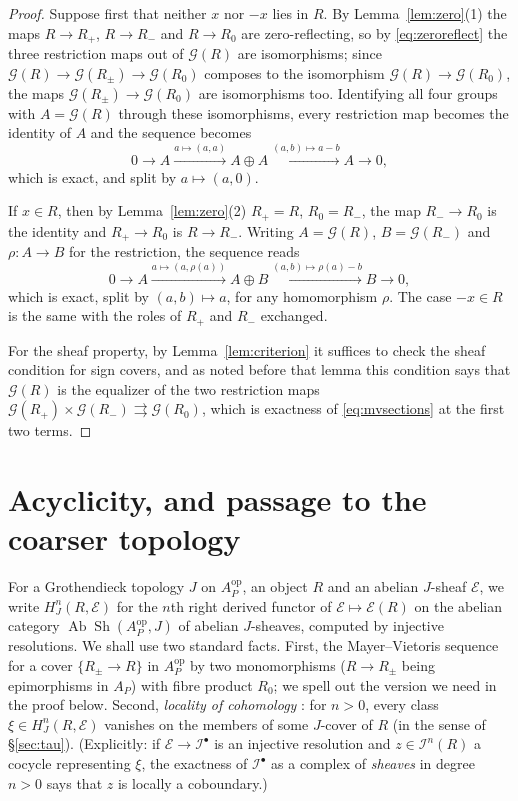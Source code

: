 \documentclass[12pt]{article}
\newcommand{\Sh}{\operatorname{Sh}}
\newcommand{\Ab}{\operatorname{Ab}}
\newcommand{\G}{\mathcal G}
\newcommand{\E}{\mathcal E}
\newcommand{\I}{\mathcal I}
\theoremstyle{definition}
\theoremstyle{remark}
\begin{document}
\begin{proof}
Suppose first that neither \(x\) nor \(-x\) lies in \(R\).  By
Lemma~\ref{lem:zero}(1) the maps \(R\to R_+\), \(R\to R_-\) and
\(R\to R_0\) are zero-reflecting, so by \eqref{eq:zeroreflect} the three
restriction maps out of \(\G(R)\) are isomorphisms; since
\(\G(R)\to\G(R_\pm)\to\G(R_0)\) composes to the isomorphism
\(\G(R)\to\G(R_0)\), the maps \(\G(R_\pm)\to\G(R_0)\) are isomorphisms too.
Identifying all four groups with \(A=\G(R)\) through these isomorphisms,
every restriction map becomes the identity of \(A\) and the sequence
becomes
\[
                   0\longrightarrow A
                    \xrightarrow{a\mapsto(a,a)}A\oplus A
                    \xrightarrow{(a,b)\mapsto a-b}A
                    \longrightarrow0,
\]
which is exact, and split by \(a\mapsto(a,0)\).

If \(x\in R\), then by Lemma~\ref{lem:zero}(2) \(R_+=R\), \(R_0=R_-\), the
map \(R_-\to R_0\) is the identity and \(R_+\to R_0\) is \(R\to R_-\).
Writing \(A=\G(R)\), \(B=\G(R_-)\) and \(\rho:A\to B\) for the restriction,
the sequence reads
\[
                   0\longrightarrow A
                    \xrightarrow{a\mapsto(a,\rho(a))}A\oplus B
                    \xrightarrow{(a,b)\mapsto \rho(a)-b}B
                    \longrightarrow0,
\]
which is exact, split by \((a,b)\mapsto a\), for any homomorphism \(\rho\).
The case \(-x\in R\) is the same with the roles of \(R_+\) and \(R_-\)
exchanged.

For the sheaf property, by Lemma~\ref{lem:criterion} it suffices to check
the sheaf condition for sign covers, and as noted before that lemma this
condition says that \(\G(R)\) is the equalizer of the two restriction maps
\(\G(R_+)\times\G(R_-)\rightrightarrows\G(R_0)\), which is exactness of
\eqref{eq:mvsections} at the first two terms.
\end{proof}

\section{Acyclicity, and passage to the coarser topology}
\label{sec:acyclic}

For a Grothendieck topology \(J\) on \(A_P^{\mathrm{op}}\), an object \(R\)
and an abelian \(J\)-sheaf \(\E\), we write \(H^n_J(R,\E)\) for the \(n\)th
right derived functor of \(\E\mapsto\E(R)\) on the abelian category
\(\Ab\Sh(A_P^{\mathrm{op}},J)\) of abelian \(J\)-sheaves, computed by
injective resolutions.  We shall
use two standard facts.  First, the Mayer--Vietoris sequence
\cite[Tag 0EVY]{stacks} for a cover \(\{R_\pm\to R\}\) in
\(A_P^{\mathrm{op}}\) by two monomorphisms (\(R\to R_\pm\) being
epimorphisms in \(A_P\)) with fibre product \(R_0\); we spell out the
version we need in the proof below.  Second,
\emph{locality of cohomology} \cite[Tag 03P1]{stacks}: for \(n>0\), every
class \(\xi\in H^n_J(R,\E)\) vanishes on the members of some \(J\)-cover
of \(R\) (in the sense of \S\ref{sec:tau}).  (Explicitly: if \(\E\to\I^\bullet\) is an injective
resolution and \(z\in\I^n(R)\) a cocycle representing \(\xi\), the exactness
of \(\I^\bullet\) as a complex of \emph{sheaves} in degree \(n>0\) says that
\(z\) is locally a coboundary.)
\end{document}
